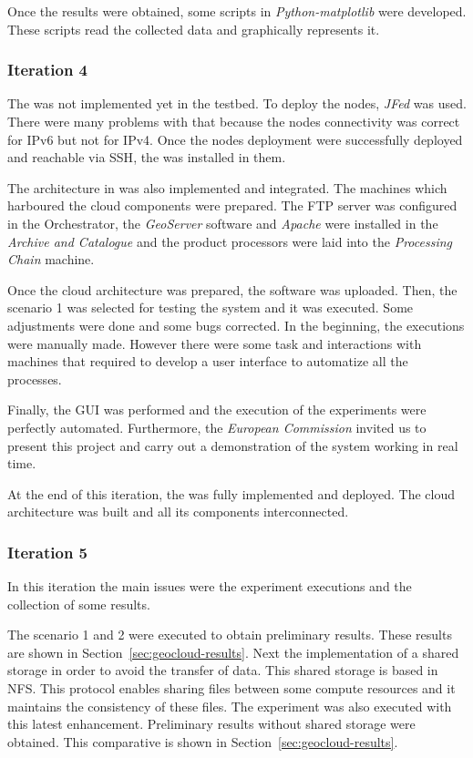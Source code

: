 Once the results were obtained, some scripts in \emph{Python-matplotlib} were
developed. These scripts read the collected data and graphically represents it.

\subsubsection{Iteration 4}

The \sss was not implemented yet in the \vw testbed. To deploy the nodes,
\emph{JFed} was used. There were many problems with that
because the nodes connectivity was correct for \ac{IP}v6 but not for
\ac{IP}v4. Once the nodes deployment were successfully deployed and reachable
via \ac{SSH}, the \sss was installed in them.  

The architecture in \bonfire was also implemented and integrated. The
machines which harboured the cloud components were prepared. The \ac{FTP} server
was configured in the Orchestrator, the \emph{GeoServer} software and
\emph{Apache} were installed
in the \emph{Archive and Catalogue} and the product processors were laid into
the \emph{Processing Chain} machine.

Once the cloud architecture was prepared, the software was uploaded. Then, the
scenario 1 was selected for testing the system and it was executed. Some
adjustments were done and some bugs corrected. In the beginning, the executions
were manually made. However there were some task and
interactions with machines that required to develop a user interface to
automatize all the processes.

Finally, the \ac{GUI} was performed and the execution of the experiments were
perfectly automated. Furthermore, the \emph{European Commission} invited us to
present this project and carry out a demonstration of the system working in real
time.

At the end of this iteration, the \sss was fully implemented and deployed. The
cloud architecture was built and all its components interconnected.


\subsubsection{Iteration 5}

In this iteration the main issues were the experiment executions and the
collection of some results. 

The scenario 1 and 2 were executed to obtain preliminary results. These results
are shown in Section~\ref{sec:geocloud-results}. Next the implementation of a shared
storage in order to avoid the transfer of data. This
shared storage is based in \ac{NFS}. This protocol enables sharing files between
some compute resources and it maintains the consistency of these files.
The experiment was also executed with this latest enhancement. Preliminary
results without shared storage were obtained. This
comparative is shown in Section~\ref{sec:geocloud-results}.


